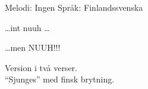 \begin{song}


\begin{songmeta}
Melodi: Ingen
Språk: Finlandssvenska
\end{songmeta}

\begin{songtext}
\ldots int nuuh \ldots

\ldots men NUUH!!!
\end{songtext}

\begin{songnotes}
Version i två verser. \\
\textquotedblleft{}Sjunges\textquotedblright{} med finsk brytning.
\end{songnotes}
\end{song}
